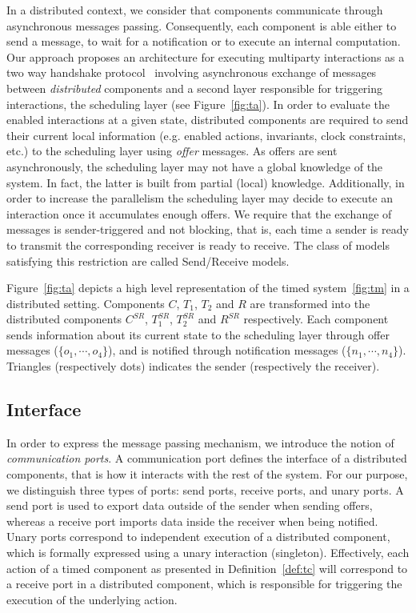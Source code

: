 In a distributed context, we consider that components communicate through asynchronous 
messages passing. Consequently, each component is able either to send a message, to wait for 
a notification or to execute an internal computation. Our approach proposes an architecture for 
executing multiparty interactions as a two way handshake 
protocol~\cite{ahlem_these,conf_free,jean} involving asynchronous 
exchange of messages between \emph{distributed} components and a second layer responsible for 
triggering interactions, the scheduling layer (see Figure~\ref{fig:ta}). 
In order to evaluate the enabled interactions at a given state, distributed components are 
required to send their current local information (e.g. enabled actions, invariants, 
clock constraints, etc.) to the scheduling layer using \emph{offer} messages. 
As offers are sent asynchronously,  
the scheduling layer may not have a global knowledge of the system. In fact, the latter
is built from partial (local) knowledge. Additionally, in order to increase the parallelism
the scheduling layer may decide to execute an interaction once it accumulates enough offers.
We require that the exchange of messages is sender-triggered and not blocking, that is,
each time a sender is ready to transmit the corresponding receiver is ready to receive.
The class of models satisfying this restriction are called Send/Receive models.

\begin{example}
  Figure~\ref{fig:ta} depicts a high level representation of the timed system~\ref{fig:tm} in a 
  distributed setting. Components $C$, $T_1$, $T_2$ and $R$ are transformed into the distributed
  components $C^{SR}$, $T_1^{SR}$, $T_2^{SR}$ and $R^{SR}$ respectively. Each component sends 
  information about its current state to the scheduling layer through offer messages
  ($\{o_1,\cdots,o_4\}$), and is notified through notification messages ($\{n_1,\cdots,n_4\}$).
  Triangles (respectively dots) indicates the sender (respectively the receiver). 
\end{example}


\subsection{Interface}
In order to express the message passing mechanism, we introduce the notion of 
\emph{communication ports}. A communication port defines the interface of a distributed 
components, that is how it interacts with the rest of the system. For our purpose, we distinguish
three types of ports: send ports, receive ports, and unary ports.
A send port is used to export data outside of the sender when sending offers, whereas
a receive port imports data inside the receiver  
when being notified. Unary ports correspond to independent execution of a distributed 
component, which is formally expressed using a unary interaction (singleton). 
Effectively, each action of a timed component as presented in Definition~\ref{def:tc} 
will correspond to a receive port in a distributed component, which is responsible for triggering
the execution of the underlying action.

